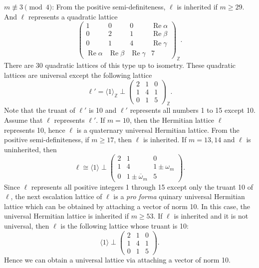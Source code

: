 \documentclass[a4paper,10pt,reqno]{amsart}
\begin{document}
{} $m {\not\equiv} 3 \pmod{4}$: From the positive semi-definiteness, $\ell$ is inherited
if $m \ge 29$. And $\ell$ represents a quadratic lattice
\[
    \begin{pmatrix}
        1 & 0 & 0 & {\operatorname{Re}}{\alpha} \\
        0 & 2 & 1 & {\operatorname{Re}}{\beta} \\
        0 & 1 & 4 & {\operatorname{Re}}{\gamma} \\
        {\operatorname{Re}}{\alpha} & {\operatorname{Re}}{\beta} & {\operatorname{Re}}{\gamma} & 7
    \end{pmatrix}_{\mathbb{Z}}.
\]
There are 30 quadratic lattices of this type up to isometry. These quadratic lattices are universal
except the following lattice
\[
    \ell' = {\langle {1} \rangle}_{\mathbb{Z}} \perp {\begin{pmatrix}
  {2} & {1} & {0} \\
  {1} & {4} & {1} \\
  {0} & {1} & {5}
\end{pmatrix}}_{\mathbb{Z}}.
\]
Note that the truant of $\ell'$ is 10 and $\ell'$ represents all numbers 1 to 15 except 10. Assume
that $\ell$ represents $\ell'$. If $m=10$, then the Hermitian lattice $\ell$ represents 10, hence
$\ell$ is a quaternary universal Hermitian lattice. From the positive semi-definiteness, if $m \geq
17$, then $\ell$ is inherited. If $m = 13, 14$ and $\ell$ is uninherited, then
\[
    \ell \cong {\langle {1} \rangle} \perp {\begin{pmatrix}
  2 & 1 & 0 \\
  1 & 4 & {1\pm\omega_m} \\
  0 & {1\pm{{{\overline{\omega}}}}_m} & 5
\end{pmatrix}}.
\]
Since $\ell$ represents all positive integers 1 through 15 except only the truant 10 of $\ell$, the
next escalation lattice of $\ell$ is a \emph{pro forma} quinary universal Hermitian lattice which
can be obtained by attaching a vector of norm 10. In this case, the universal Hermitian lattice is
inherited if $m \ge 53$. If $\ell$ is inherited and it is not universal, then $\ell$ is the
following lattice whose truant is 10:
\[
    {\langle {1} \rangle} \perp {\begin{pmatrix}
  {2} & {1} & {0} \\
  {1} & {4} & {1} \\
  {0} & {1} & {5}
\end{pmatrix}}.
\]
Hence we can obtain a universal lattice via attaching a vector of norm 10.
\end{document}
